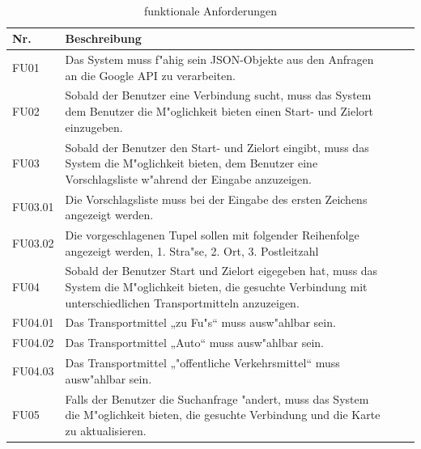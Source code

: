 \documentclass[a4paper, 11pt]{scrreprt}
\begin{document}
\begin{table}[H]

\caption{funktionale Anforderungen}

\ \\

\par

\label{tab:Tabelle1}

\centering

\begin{tabular}{|p{2.5cm} p{12cm}| ll}

\hline

Nr.	& Beschreibung\\

\hline

FU01 &	Das System muss f"ahig sein JSON-Objekte aus den Anfragen an die Google API zu verarbeiten.\\

\hline
FU02 &	Sobald der Benutzer eine Verbindung sucht, muss das System dem Benutzer die M"oglichkeit bieten einen Start- und Zielort einzugeben.\\

\hline
FU03& Sobald der Benutzer den Start- und Zielort eingibt, muss das System die M"oglichkeit bieten, dem Benutzer eine Vorschlagsliste w"ahrend der Eingabe anzuzeigen.\\

\hline
FU03.01	&Die Vorschlagsliste muss bei der Eingabe des ersten Zeichens angezeigt werden.\\

\hline
FU03.02	&Die vorgeschlagenen Tupel sollen mit folgender Reihenfolge angezeigt werden, 1. Stra"se, 2. Ort, 3. Postleitzahl\\

\hline
FU04	&Sobald der Benutzer Start und Zielort eigegeben hat, muss das System die M"oglichkeit bieten, die gesuchte Verbindung mit unterschiedlichen Transportmitteln anzuzeigen.\\

\hline
FU04.01	&Das Transportmittel „zu Fu"s“ muss ausw"ahlbar sein.\\

\hline
FU04.02&	Das Transportmittel  „Auto“ muss ausw"ahlbar sein.\\

\hline
FU04.03	&Das Transportmittel „"offentliche Verkehrsmittel“ muss ausw"ahlbar sein.\\

\hline
FU05	&Falls der Benutzer die Suchanfrage "andert, muss das System die M"oglichkeit bieten, die gesuchte Verbindung und die Karte zu aktualisieren.\\


\end{tabular}
\end{table}
\end{document}
